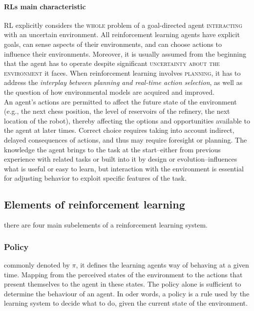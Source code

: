 \documentclass[11pt]{article}
\begin{document}
\paragraph{RLs main characteristic}
RL explicitly considers the \textsc{whole} problem of a goal-directed agent \textsc{interacting} with an uncertain environment. All reinforcement learning agents have explicit goals, can sense aspects of their environments, and can choose actions to influence their environments. Moreover, it is usually assumed from the beginning that the agent has to operate despite significant \textsc{uncertainty about the environment} it faces. When reinforcement learning involves \textsc{planning}, it has to address the \textit{interplay between planning and real-time action selection}, as well as the question of how environmental models are acquired and improved.\\
An agent's actions are permitted to affect the future state of the environment (e.g., the next chess position, the level of reservoirs of the refinery, the next location of the robot), thereby affecting the options and opportunities available to the agent at later times. Correct choice requires taking into account indirect, delayed consequences of actions, and thus may require foresight or planning. The knowledge the agent brings to the task at the start--either from previous experience with related tasks or built into it by design or evolution--influences what is useful or easy to learn, but interaction with the environment is essential for adjusting behavior to exploit specific features of the task.

\subsection{Elements of reinforcement learning}
there are four main subelements of a reinforcement learning system.

\subsubsection*{Policy}
commonly denoted by $\pi$, it defines the learning agents way of behaving at a given time. Mapping from the perceived states of the environment to the actions that present themselves to the agent in these states. The policy alone is sufficient to determine the behaviour of an agent. In oder words, a policy is a rule used by the learning system to decide what to do, given the current state of the environment.
\end{document}

